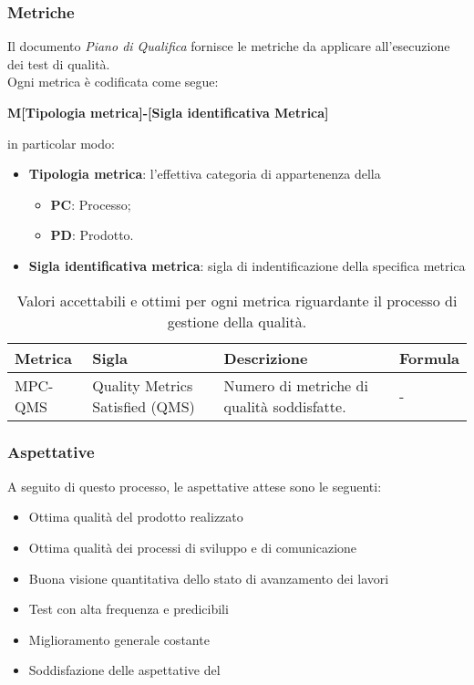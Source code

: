 \subsubsection{Metriche}
Il documento \textit{Piano di Qualifica} fornisce le metriche da applicare all'esecuzione dei test di qualità.
\\Ogni metrica è codificata come segue:
\begin{center}
    \textbf{M[Tipologia metrica]-[Sigla identificativa Metrica]}
\end{center}
in particolar modo:
\begin{itemize}
	\item{\textbf{Tipologia metrica}: l'effettiva categoria di appartenenza della }
	\begin{itemize}
    \item \textbf{PC}: Processo;
		\item \textbf{PD}: Prodotto.
	\end{itemize}
	\item{\textbf{Sigla identificativa metrica}: sigla di indentificazione della specifica metrica}
\end{itemize}
\clearpage
{} \label{sec:gestione_qualita}
\begin{table}[H]	
	\centering
	\begin{tabular}{p{2cm} p{3cm} p{6cm} p{4cm}}
		\toprule
		\textbf{Metrica}& \textbf{Sigla} & \textbf{Descrizione} & \textbf{Formula} \\
		\midrule
		MPC-QMS & Quality Metrics Satisfied (QMS) & Numero di metriche di qualità soddisfatte. & - \\
		\bottomrule
	\end{tabular}
	\caption{Valori accettabili e ottimi per ogni metrica riguardante il processo di gestione della qualità.}
	\label{table:Valori accettabili e ottimi per ogni metrica riguardante il processo di gestione della qualità.}
\end{table}

\subsubsection{Aspettative}
A seguito di questo processo, le aspettative attese sono le seguenti:
\begin{itemize}
    \item{Ottima qualità del prodotto realizzato}
    \item{Ottima qualità dei processi di sviluppo e di comunicazione}
    \item{Buona visione quantitativa dello stato di avanzamento dei lavori}
    \item{Test con alta frequenza e predicibili}
    \item{Miglioramento generale costante}
    \item{Soddisfazione delle aspettative del }
\end{itemize}

